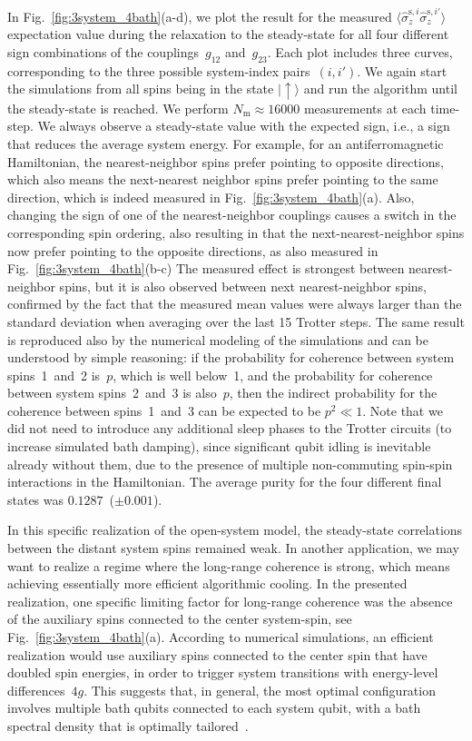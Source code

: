 \documentclass[twocolumn,amsmath,amssymb,pra]{revtex4-2}
\begin{document}
In Fig.~\ref{fig:3system_4bath}(a-d),
we plot the result for the measured $\langle \hat\sigma^{\textrm{s},i}_z\hat\sigma^{\textrm{s},i'}_z \rangle$ expectation value
during the relaxation to the steady-state for all four different sign combinations of the couplings~$g_{12}$ and~$g_{23}$.
Each plot includes three curves, corresponding to the three possible system-index pairs~$(i,i')$.
We again start the simulations from all spins being in the state $\lvert\uparrow\rangle$
and run the algorithm until the steady-state is reached.
We perform $N_\textrm{m}\approx 16000$ measurements at each time-step.
We always observe a steady-state value  with the expected sign, i.e., a sign that reduces the average system energy.
For example, for an antiferromagnetic Hamiltonian, the nearest-neighbor spins prefer pointing to opposite directions,
which also means the next-nearest neighbor spins prefer pointing to the same direction, which is indeed measured in Fig.~\ref{fig:3system_4bath}(a).
Also, changing the sign of one of the nearest-neighbor couplings causes a switch in the corresponding spin ordering,
also resulting in that the next-nearest-neighbor spins now prefer pointing to the opposite directions, as also measured in Fig.~\ref{fig:3system_4bath}(b-c)
The measured effect is strongest between nearest-neighbor spins,
but it is also observed between next nearest-neighbor spins, confirmed by the fact that
the measured mean values were always larger than the standard deviation when averaging over the last 15 Trotter steps.
The same result is reproduced also by the numerical modeling of the simulations and can be understood by simple reasoning:
if the probability for coherence between system spins~1~and~2 is~$p$, which is well below~1,
and the probability for coherence between system spins~2~and~3 is also~$p$,
then the indirect probability for the coherence between spins~1~and~3 can be expected to be $p^2 \ll 1$.
Note that we did not need to introduce any additional sleep phases to the Trotter circuits (to increase simulated bath damping),
since significant qubit idling is inevitable already without them, due to the presence of multiple non-commuting spin-spin interactions in the Hamiltonian.
The average purity for the four different final states was $0.1287$~($\pm 0.001$).

In this specific realization of the open-system model,
the steady-state correlations between the distant system spins remained weak.
In another application, we may want to realize a regime where the long-range coherence is strong,
which means achieving essentially more efficient algorithmic cooling.
In the presented realization,
one specific limiting factor for long-range coherence was the absence of the auxiliary spins connected to the center system-spin, see Fig.~\ref{fig:3system_4bath}(a).
According to numerical simulations, an efficient realization would use auxiliary spins connected to the center spin
that have doubled spin energies, in order to trigger system transitions with energy-level differences~$4g$.
This suggests that, in general, the most optimal configuration involves multiple bath qubits connected to each system qubit, with a bath spectral density that is optimally tailored~\cite{Leppakangas2023}.
\end{document}

